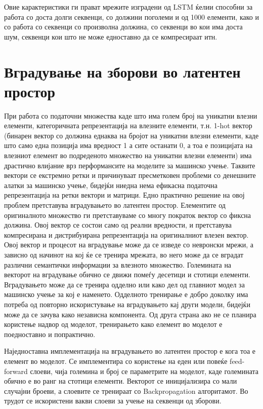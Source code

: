 Овие карактеристики ги прават мрежите изградени од LSTM ќелии способни за работа со доста долги секвенци, со должини поголеми и од 1000 елементи, како и со работа со секвенци со произволна должина, со секвенци во кои има доста шум, секвенци кои што не може едноставно да се компресираат итн.

\section{Вградување на зборови во латентен простор}

При работа со податочни множества каде што има голем број на уникатни влезни елементи, категоричната репрезентација на влезните елементи, т.н. 1-hot вектор (бинарен вектор со должина еднаква на бројот на уникатни влезни елементи, каде што само една позиција има вредност 1 а сите останати 0, а тоа е позицијата на влезниот елемент во подреденото множество на уникатни влезни елементи) има драстично влијание врз перформансите на моделите за машинско учење. Таквите вектори се екстремно ретки и причинуваат пресметковен проблеми со денешните алатки за машинско учење, бидејќи ниедна нема ефикасна податочна репрезентација на ретки вектори и матрици. 
Едно практично решение на овој проблем претставува вградувањето во латентен простор. Елементите од оригиналното множество ги претставуваме со многу пократок вектор со фиксна должина. Овој вектор се состои само од реални вредности, и претставува компресирана и дистрибуирана репрезентација на оригиналниот влезен вектор. Овој вектор и процесот на вградување може да се изведе со невронски мрежи, а зависно од начинот на кој ќе се тренира мрежата, во него може да се вградат различни семантички информации за влезното множество. Големината на векторот на вградување обично се движи помеѓу десетици и стотици елементи.
Вградувањето може да се тренира одделно или како дел од главниот модел за машинско учење за кој е наменето. Одделното тренирање е добро доколку има потреба од повторно искористување на вградувањето кај други модели, бидејќи може да се зачува како независна компонента. Од друга страна ако не се планира користење надвор од моделот, тренирањето како елемент во моделот е поедноставно и попрактично.

Наједноставна имплементација на вградувањето во латентен простор е кога тоа е елемент во моделот. Се имплементира со користење на еден или повеќе feed-forward слоеви, чија големина и број се параметрите на моделот, каде големината обично е во ранг на стотици елементи. Векторот се иницијализира со мали случајни броеви, а слоевите се тренираат со Backpropagation алгоритамот. Во трудот \cite{Sutskever2014} се искористени вакви слоеви за учење на секвенци од зборови. 

